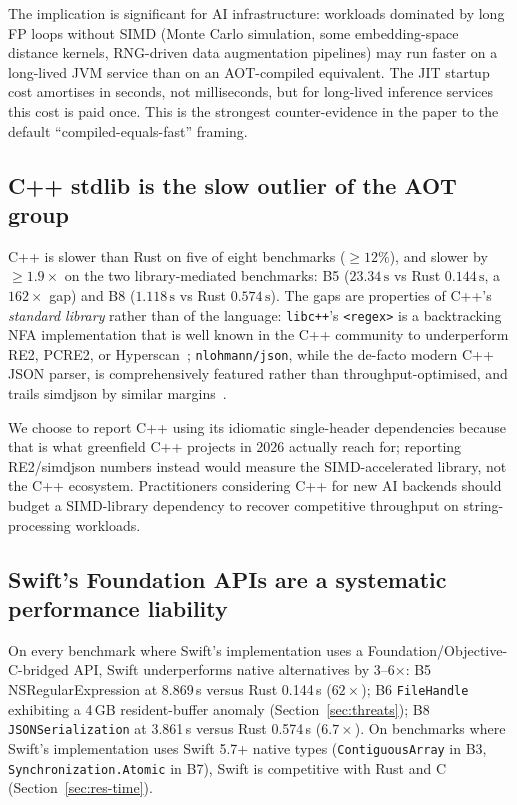 \documentclass[10pt,conference]{IEEEtran}
\begin{document}
The implication is significant for AI infrastructure: workloads
dominated by long FP loops without SIMD (Monte Carlo simulation,
some embedding-space distance kernels, RNG-driven data
augmentation pipelines) may run faster on a long-lived JVM
service than on an AOT-compiled equivalent. The JIT startup cost
amortises in seconds, not milliseconds, but for long-lived
inference services this cost is paid once. This is the strongest
counter-evidence in the paper to the default
``compiled-equals-fast'' framing.

\subsection{C++ stdlib is the slow outlier of the AOT group}

C++ is slower than Rust on five of eight benchmarks
($\geq 12\%$), and slower by $\geq 1.9\times$ on the two
library-mediated benchmarks: B5 ($23.34\,\textrm{s}$ vs Rust
$0.144\,\textrm{s}$, a $162\times$ gap) and B8 ($1.118\,\textrm{s}$
vs Rust $0.574\,\textrm{s}$). The gaps are properties of C++'s
\emph{standard library} rather than of the language: \texttt{libc++}'s
\texttt{<regex>} is a backtracking NFA implementation that is well
known in the C++ community to underperform RE2, PCRE2, or
Hyperscan~\cite{cox2007regex,hyperscan2019}; \texttt{nlohmann/json},
while the de-facto modern C++ JSON parser, is comprehensively
featured rather than throughput-optimised, and trails simdjson by
similar margins~\cite{simdjson2019}.

We choose to report C++ using its idiomatic single-header
dependencies because that is what greenfield C++ projects in 2026
actually reach for; reporting RE2/simdjson numbers instead would
measure the SIMD-accelerated library, not the C++ ecosystem.
Practitioners considering C++ for new AI backends should budget a
SIMD-library dependency to recover competitive throughput on
string-processing workloads.

\subsection{Swift's Foundation APIs are a systematic performance liability}

On every benchmark where Swift's implementation uses a
Foundation/Objective-C-bridged API, Swift underperforms native
alternatives by 3--6$\times$: B5 NSRegularExpression at 8.869\,s
versus Rust 0.144\,s ($62\times$); B6 \texttt{FileHandle}
exhibiting a 4\,GB resident-buffer anomaly
(Section~\ref{sec:threats}); B8 \texttt{JSONSerialization} at
3.861\,s versus Rust 0.574\,s ($6.7\times$). On benchmarks where
Swift's implementation uses Swift 5.7+ native types
(\texttt{ContiguousArray} in B3, \texttt{Synchronization.Atomic}
in B7), Swift is competitive with Rust and C
(Section~\ref{sec:res-time}).
\end{document}
